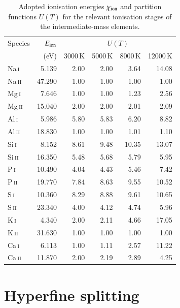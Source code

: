 \documentclass[traditabstract]{aa}
\newcommand{\altnai}{Na\,\textsc{i}}
\newcommand{\altnaii}{Na\,\textsc{ii}}
\newcommand{\altmgi}{Mg\,\textsc{i}}
\newcommand{\altmgii}{Mg\,\textsc{ii}}
\newcommand{\altali}{Al\,\textsc{i}}
\newcommand{\altalii}{Al\,\textsc{ii}}
\newcommand{\altsii}{Si\,\textsc{i}}
\newcommand{\altsiii}{Si\,\textsc{ii}}
\newcommand{\altphosi}{P\,\textsc{i}}
\newcommand{\altphosii}{P\,\textsc{ii}}
\newcommand{\altsuli}{S\,\textsc{i}}
\newcommand{\altsulii}{S\,\textsc{ii}}
\newcommand{\altki}{K\,\textsc{i}}
\newcommand{\altkii}{K\,\textsc{ii}}
\newcommand{\altcai}{Ca\,\textsc{i}}
\newcommand{\altcaii}{Ca\,\textsc{ii}}
\newcommand{\nai}{\altnai\ }
\newcommand{\naii}{\altnaii\ }
\newcommand{\mgi}{\altmgi\ }
\newcommand{\mgii}{\altmgii\ }
\newcommand{\ali}{\altali\ }
\newcommand{\alii}{\altalii\ }
\newcommand{\sii}{\altsii\ }
\newcommand{\siii}{\altsiii\ }
\newcommand{\phosi}{\altphosi\ }
\newcommand{\phosii}{\altphosii\ }
\newcommand{\suli}{\altsuli\ }
\newcommand{\sulii}{\altsulii\ }
\newcommand{\ki}{\altki\ }
\newcommand{\kii}{\altkii\ }
\newcommand{\cai}{\altcai\ }
\newcommand{\caii}{\altcaii\ }
\begin{document}
\begin{table}
\caption{Adopted ionisation energies $\chi_{\rm ion}$ and partition functions $U(T)$ 
for the relevant ionisation stages of the intermediate-mass elements.}
\label{table:partition} 
\centering
\begin{tabular}{l r r r r r}
\hline
\hline Species & $E_{\rm ion}$  &  \multicolumn{4}{c}{$U(T)$} \\
               &        (eV)            & 3000\,K & 5000\,K & 8000\,K & 12000\,K \\
\hline
  \nai   &   5.139 &      2.00 &      2.00 &      3.64 &     14.08 \\
  \naii  &  47.290 &      1.00 &      1.00 &      1.00 &      1.00 \\
  \mgi   &   7.646 &      1.00 &      1.00 &      1.23 &      2.56 \\
  \mgii  &  15.040 &      2.00 &      2.00 &      2.01 &      2.09 \\
  \ali   &   5.986 &      5.80 &      5.83 &      6.20 &      8.82 \\
  \alii  &  18.830 &      1.00 &      1.00 &      1.01 &      1.10 \\
  \sii   &   8.152 &      8.61 &      9.48 &     10.35 &     13.07 \\
  \siii  &  16.350 &      5.48 &      5.68 &      5.79 &      5.95 \\
  \phosi &  10.490 &      4.04 &      4.43 &      5.46 &      7.42 \\
  \phosii&  19.770 &      7.84 &      8.63 &      9.55 &     10.52 \\
  \suli  &  10.360 &      8.29 &      8.88 &      9.61 &     10.65 \\
  \sulii &  23.340 &      4.00 &      4.12 &      4.74 &      5.96 \\
  \ki    &   4.340 &      2.00 &      2.11 &      4.66 &     17.05 \\
  \kii   &  31.630 &      1.00 &      1.00 &      1.00 &      1.00 \\
  \cai   &   6.113 &      1.00 &      1.11 &      2.57 &     11.22 \\
  \caii  &  11.870 &      2.00 &      2.19 &      2.89 &      4.25 \\
\hline
\end{tabular}
\end{table}


\appendix

\section{Hyperfine splitting}
\label{s:isohfs}
\end{document}
